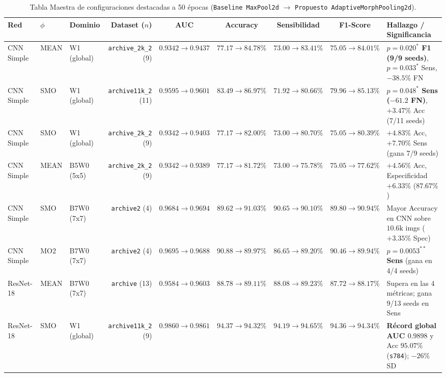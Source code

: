 \documentclass[10pt,a4paper,twocolumn]{article}
\begin{document}
\begin{table}[t]
\centering
\caption{Tabla Maestra de configuraciones destacadas a 50 épocas (\texttt{Baseline MaxPool2d} $\to$ \texttt{Propuesto AdaptiveMorphPooling2d}).}
\label{tab:master_results}
\footnotesize
\begin{tabular}{lllrccccp{4.1cm}}
\toprule
\textbf{Red} & \textbf{$\phi$} & \textbf{Dominio} & \textbf{Dataset ($n$)} & \textbf{AUC} & \textbf{Accuracy} & \textbf{Sensibilidad} & \textbf{F1-Score} & \textbf{Hallazgo / Significancia} \\
\midrule
CNN Simple & MEAN & W1 (global) & \texttt{archive\_2k\_2} (9) & $0.9342 \to \mathbf{0.9437}$ & $77.17 \to \mathbf{84.78\%}$ & $73.00 \to \mathbf{83.41\%}$ & $75.05 \to \mathbf{84.01\%}$ & \textcolor{gain}{\textbf{$p=0.020^*$ F1 (9/9 seeds)}}, $p=0.033^*$ Sens, $-38.5\%$ FN \\
CNN Simple & SMO & W1 (global) & \texttt{archive11k\_2} (11) & $0.9595 \to \mathbf{0.9601}$ & $83.49 \to \mathbf{86.97\%}$ & $71.92 \to \mathbf{80.66\%}$ & $79.96 \to \mathbf{85.13\%}$ & \textcolor{gain}{\textbf{$p=0.048^*$ Sens ($-61.2$ FN)}}, $+3.47\%$ Acc (7/11 seeds) \\
CNN Simple & SMO & W1 (global) & \texttt{archive\_2k\_2} (9) & $0.9342 \to \mathbf{0.9403}$ & $77.17 \to \mathbf{82.00\%}$ & $73.00 \to \mathbf{80.70\%}$ & $75.05 \to \mathbf{80.39\%}$ & $+4.83\%$ Acc, $+7.70\%$ Sens (gana 7/9 seeds) \\
CNN Simple & MEAN & B5W0 (5x5) & \texttt{archive\_2k\_2} (9) & $0.9342 \to \mathbf{0.9389}$ & $77.17 \to \mathbf{81.72\%}$ & $73.00 \to \mathbf{75.78\%}$ & $75.05 \to \mathbf{77.62\%}$ & $+4.56\%$ Acc, Especificidad $+6.33\%$ ($87.67\%$) \\
CNN Simple & SMO & B7W0 (7x7) & \texttt{archive2} (4) & $0.9684 \to \mathbf{0.9694}$ & $89.62 \to \mathbf{91.03\%}$ & $90.65 \to 90.10\%$ & $89.80 \to \mathbf{90.94\%}$ & Mayor Accuracy en CNN sobre $10.6\text{k}$ imgs ($+3.35\%$ Spec) \\
CNN Simple & MO2 & B7W0 (7x7) & \texttt{archive2} (4) & $0.9695 \to 0.9688$ & $90.88 \to 89.97\%$ & $86.65 \to \mathbf{89.20\%}$ & $90.46 \to 89.94\%$ & \textcolor{gain}{\textbf{$p=0.0053^{**}$ Sens}} (gana en 4/4 seeds) \\
\midrule
ResNet-18 & MEAN & B7W0 (7x7) & \texttt{archive} (13) & $0.9584 \to \mathbf{0.9603}$ & $88.78 \to \mathbf{89.11\%}$ & $88.08 \to \mathbf{89.23\%}$ & $87.72 \to \mathbf{88.17\%}$ & Supera en las 4 métricas; gana 9/13 seeds en Sens \\
ResNet-18 & SMO & W1 (global) & \texttt{archive11k\_2} (9) & $0.9860 \to \mathbf{0.9861}$ & $94.37 \to 94.32\%$ & $94.19 \to \mathbf{94.65\%}$ & $94.36 \to 94.34\%$ & \textcolor{gain}{\textbf{Récord global AUC $0.9898$}} y Acc $95.07\%$ (\texttt{s784}); $-26\%$ SD \\

\end{tabular}
\end{table}
\end{document}
